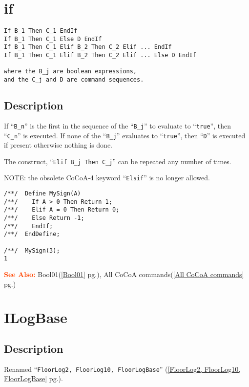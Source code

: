 \documentclass[a4paper]{mybook}
\newenvironment{command}{}{} %
\newcommand\SeeAlso{\par\textcolor{OrangeRed}{\textbf{\large See Also: }}}
\begin{document}
\section{if}
\label{if}
\begin{command} %


\begin{Verbatim}[label=syntax, rulecolor=\color{MidnightBlue},
frame=single]
If B_1 Then C_1 EndIf
If B_1 Then C_1 Else D EndIf
If B_1 Then C_1 Elif B_2 Then C_2 Elif ... EndIf
If B_1 Then C_1 Elif B_2 Then C_2 Elif ... Else D EndIf

where the B_j are boolean expressions,
and the C_j and D are command sequences.
\end{Verbatim}


\subsection*{Description}

If ``\verb&B_n&'' is the first in the sequence of the ``\verb&B_j&'' to evaluate to ``\verb&true&'',
then ``\verb&C_n&'' is executed.  If none of the ``\verb&B_j&'' evaluates to ``\verb&true&'',
then ``\verb&D&'' is executed if present otherwise nothing is done.
\par 
The construct, ``\verb&Elif B_j Then C_j&'' can be repeated any number of times.
\par 
NOTE: the obsolete CoCoA-4 keyword ``\verb&Elsif&'' is no longer allowed.
\begin{Verbatim}[label=example, rulecolor=\color{PineGreen}, frame=single]
/**/  Define MySign(A)
/**/    If A > 0 Then Return 1;
/**/    Elif A = 0 Then Return 0;
/**/    Else Return -1;
/**/    EndIf;
/**/  EndDefine;

/**/  MySign(3);
1
\end{Verbatim}


\SeeAlso %
  Bool01(\ref{Bool01} pg.\pageref{Bool01}), 
    All CoCoA commands(\ref{All CoCoA commands} pg.\pageref{All CoCoA commands})
\end{command} %

\section{ILogBase}
\label{ILogBase}
\begin{command} %



\subsection*{Description}

Renamed ``\verb&FloorLog2, FloorLog10, FloorLogBase&'' (\ref{FloorLog2, FloorLog10, FloorLogBase} pg.\pageref{FloorLog2, FloorLog10, FloorLogBase}).

\end{command} %
\end{document}
